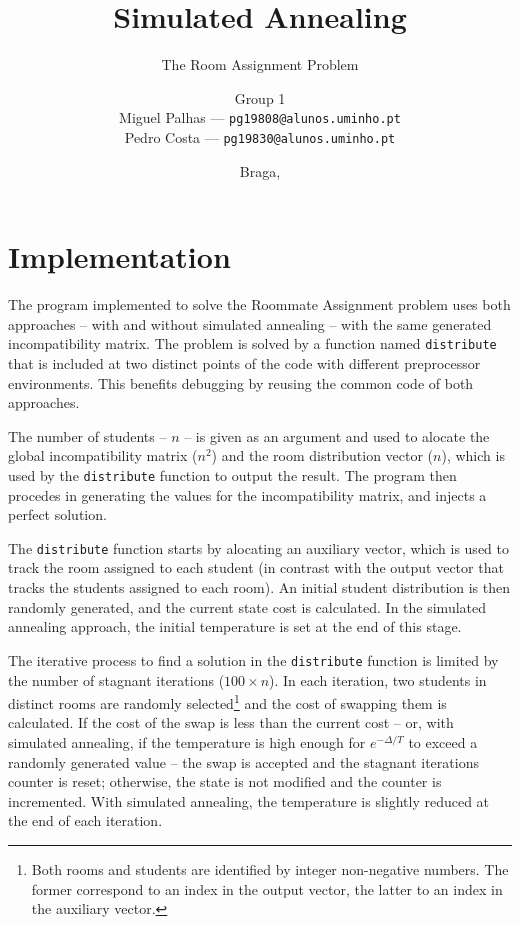 \documentclass[abstract=on,9pt,twocolumn]{scrartcl}
\title{Simulated Annealing}
\subtitle{The Room Assignment Problem}
\author{{\larger Group 1}\\Miguel Palhas \hfill--- \texttt{\smaller pg19808@alunos.uminho.pt}\\Pedro Costa \hfill--- \texttt{\smaller pg19830@alunos.uminho.pt}\\}
\date{Braga, \docdate}
\begin{document}
\maketitle




\section{Implementation}
The program implemented to solve the Roommate Assignment problem uses both approaches -- with and without simulated annealing -- with the same generated incompatibility matrix. The problem is solved by a function named \texttt{distribute} that is included at two distinct points of the code with different preprocessor environments. This benefits debugging by reusing the common code of both approaches.

The number of students -- $n$ -- is given as an argument and used to alocate the global incompatibility matrix ($n^{2}$) and the room distribution vector ($n$), which is used by the \texttt{distribute} function to output the result. The program then procedes in generating the values for the incompatibility matrix, and injects a perfect solution.

The \texttt{distribute} function starts by alocating an auxiliary vector, which is used to track the room assigned to each student (in contrast with the output vector that tracks the students assigned to each room). An initial student distribution is then randomly generated, and the current state cost is calculated. In the simulated annealing approach, the initial temperature is set at the end of this stage.

The iterative process to find a solution in the \texttt{distribute} function is limited by the number of stagnant iterations ($100\times n$). In each iteration, two students in distinct rooms are randomly selected\footnote{Both rooms and students are identified by integer non-negative numbers. The former correspond to an index in the output vector, the latter to an index in the auxiliary vector.} and the cost of swapping them is calculated. If the cost of the swap is less than the current cost -- or, with simulated annealing, if the temperature is high enough for $e^{-\Delta/T}$ to exceed a randomly generated value -- the swap is accepted and the stagnant iterations counter is reset; otherwise, the state is not modified and the counter is incremented. With simulated annealing, the temperature is slightly reduced at the end of each iteration.
\end{document}

